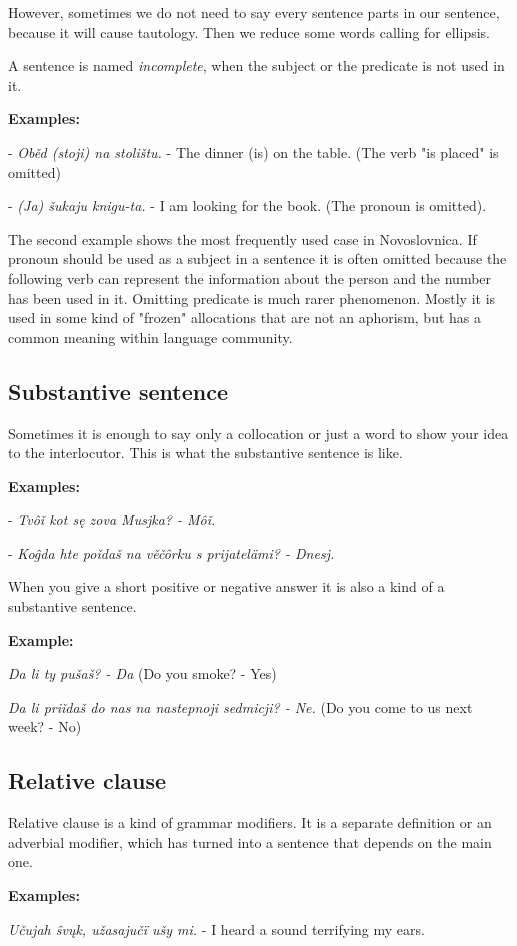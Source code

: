 However, sometimes we do not need to say every sentence parts in our sentence, because it will cause tautology. Then we reduce some words calling for ellipsis.

A sentence is named \textit{incomplete}, when the subject or the predicate is not used in it.

\textbf{Examples:}

- \textit{Oběd (stoji) na stolištu.} - The dinner (is) on the table. (The verb "is placed" is omitted)

- \textit{(Ja) šukaju knigu-ta.} - I am looking for the book. (The pronoun is omitted).

The second example shows the most frequently used case in Novoslovnica. If pronoun should be used as a subject in a sentence it is often omitted because the following verb can represent the information about the person and the number has been used in it. Omitting predicate is much rarer phenomenon. Mostly it is used in some kind of "frozen" allocations that are not an aphorism, but has a common meaning within language community.

\subsection{Substantive sentence}

Sometimes it is enough to say only a collocation or just a word to show your idea to the interlocutor. This is what the substantive sentence is like.

\textbf{Examples:}

- \textit{Tvôǐ kot sę zova Musjka? - Môǐ.}

- \textit{Koĝda hte poǐdaš na věčôrku s prijatelämi? - Dnesj.}

When you give a short positive or negative answer it is also a kind of a substantive sentence.

\textbf{Example:}

\textit{Da li ty pušaš? - Da} (Do you smoke? - Yes)

\textit{Da li priǐdaš do nas na nastepnoji sedmicji? - Ne.} (Do you come to us next week? - No)

\subsection{Relative clause}

Relative clause is a kind of grammar modifiers. It is a separate definition or an adverbial modifier, which has turned into a sentence that depends on the main one.

\textbf{Examples:}

\textit{Učujah ŝvųk, užasajučï ušy mi.} - I heard a sound terrifying my ears.